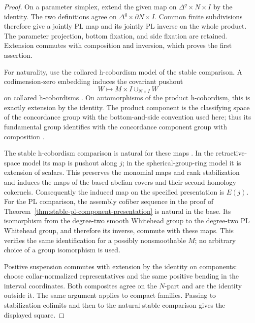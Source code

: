\begin{proof}
On a parameter simplex, extend the given map on
$\Delta^q\times N\times I$ by the identity.  The two definitions agree
on $\Delta^q\times\partial N\times I$.  Common finite subdivisions
therefore give a jointly PL map and its jointly PL inverse on the
whole product.  The parameter projection, bottom fixation, and side
fixation are retained.  Extension commutes with composition and
inversion, which proves the first assertion.

For naturality, use the collared h-cobordism model of the stable
comparison.  A codimension-zero embedding induces the covariant
pushout
\[
                    W\longmapsto M\times I\cup_{N\times I}W
\]
on collared h-cobordisms
\cite[Definition~1.1.3(b), pp.~8--9]{WaldhausenJahrenRognes2013}.
On automorphisms of the product h-cobordism, this is exactly extension
by the identity.  The product component is the classifying space of
the concordance group with the bottom-and-side convention used here;
thus its fundamental group identifies with the concordance component
group with composition
\cite[Remark~1.1.11 and (1.1.12),
pp.~12--13]{WaldhausenJahrenRognes2013}.

The stable h-cobordism comparison is natural for these maps
\cite[Theorem~0.1, p.~1, and Theorem~1.1.8,
p.~11]{WaldhausenJahrenRognes2013}.
In the retractive-space model its map is pushout along $j$; in the
spherical-group-ring model it is extension of scalars.  This preserves
the monomial maps and rank stabilization and induces the maps of the
based abelian covers and their second homology cokernels.  Consequently
the induced map on the specified presentation is $E(j)$.
For the PL comparison, the assembly cofiber sequence in the proof of
Theorem~\ref{thm:stable-pl-component-presentation} is natural in the
base. Its isomorphism from the degree-two smooth Whitehead group to
the degree-two PL Whitehead group, and therefore its inverse, commute
with these maps. This verifies the same identification for a possibly
nonsmoothable $M$; no arbitrary choice of a group isomorphism is used.

Positive suspension commutes with extension by the identity on
components: choose collar-normalized representatives and the same
positive bending in the interval coordinates.  Both composites agree
on the $N$-part and are the identity outside it.  The same argument
applies to compact families.  Passing to stabilization colimits and
then to the natural stable comparison gives the displayed square.
\end{proof}

